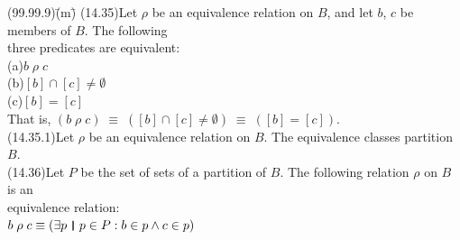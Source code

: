 \documentclass{amsart}
\newcommand{\lgap}{2pt}                             %
\newcommand{\thedr}{\rule[-.25ex]{.32mm}{1.75ex}}   %
\newcommand{\dr}{\;\,\thedr\,\;}                    %
\newcommand{\rb}{:}                                 %
\newcommand{\ext}{\exists}                          %
\begin{document}
\newpage

\begin{tabbing}
(99.99.9)\;\=(m)\;\=\kill
(14.35)\>Let $\rho$ be an equivalence relation on $B$, and let $b$, $c$ be members of $B$. The following\\[\lgap]
       \>three predicates are equivalent:\\[\lgap]
       \>(a)\>$b\; \rho\; c$\\[\lgap]
       \>(b)\>$[b] \cap [c] \neq \emptyset$\\[\lgap]
       \>(c)\>$[b] = [c]$\\[\lgap]
       \>That is, $(b\; \rho\; c) \;\equiv\; ([b] \cap [c] \neq \emptyset) \;\equiv\; ([b] = [c])$.\\[\lgap]
(14.35.1)\>Let $\rho$ be an equivalence relation on $B$. The equivalence classes partition $B$.\\[\lgap]
(14.36)\>Let $P$ be the set of sets of a partition of $B$. The following relation $\rho$ on $B$ is an\\[\lgap]
       \>equivalence relation:\\[\lgap]
       \>$b\; \rho\; c \equiv (\ext p\dr p\in P\rb b\in p \land c\in p)$\\[\lgap]
\end{tabbing}
\end{document}
